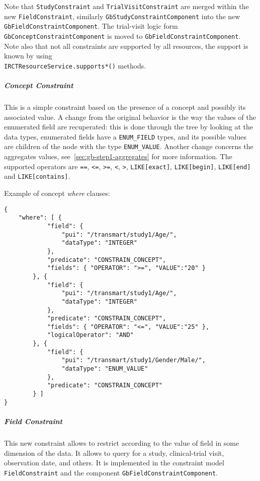 Note that \verb|StudyConstraint| and \verb|TrialVisitConstraint| are merged within the new \verb|FieldConstraint|, similarly \verb|GbStudyConstraintComponent| into the new \verb|GbFieldConstraintComponent|.
The trial-visit logic form \verb|GbConceptConstraintComponent| is moved to \verb|GbFieldConstraintComponent|.
Note also that not all constraints are supported by all resources, the support is known by using \\
\verb|IRCTResourceService.supports*()| methods. 

\subparagraph{Concept Constraint}
This is a simple constraint based on the presence of a concept and possibly its associated value.
A change from the original behavior is the way the values of the enumerated field are recuperated: this is done through the tree by looking at the data types, enumerated fields have a \verb|ENUM_FIELD| types, and its possible values are children of the node with the type \verb|ENUM_VALUE|.
Another change concerns the aggregates values, see~\ref{sec:gb-step1-aggregates} for more information.
The supported operators are \verb|==|, \verb|<=|, \verb|>=|, \verb|<|, \verb|>|, \verb|LIKE[exact]|, \verb|LIKE[begin]|, \verb|LIKE[end]| and \verb|LIKE[contains]|.

Example of concept \emph{where} clauses:
\begin{verbatim}
{
    "where": [ {
            "field": {
                "pui": "/transmart/study1/Age/",
                "dataType": "INTEGER"
            },
            "predicate": "CONSTRAIN_CONCEPT", 
            "fields": { "OPERATOR": ">=", "VALUE":"20" } 
        }, {
            "field": {
                "pui": "/transmart/study1/Age/",
                "dataType": "INTEGER"
            },
            "predicate": "CONSTRAIN_CONCEPT", 
            "fields": { "OPERATOR": "<=", "VALUE":"25" },
            "logicalOperator": "AND"
        }, {
            "field": {
                "pui": "/transmart/study1/Gender/Male/",
                "dataType": "ENUM_VALUE"
            },
            "predicate": "CONSTRAIN_CONCEPT"
        } ]
}
\end{verbatim}

\subparagraph{Field Constraint}
This new constraint allows to restrict according to the value of field in some dimension of the data.
It allows to query for a study, clinical-trial visit, observation date, and others.
It is implemented in the constraint model \verb|FieldConstraint| and the component \verb|GbFieldConstraintComponent|.

